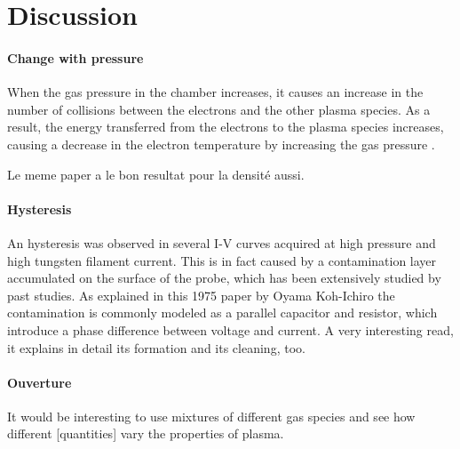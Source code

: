 \section{Discussion}

\paragraph{Change with pressure}
When the gas pressure in the chamber increases, it causes an increase in the number of collisions between the electrons and the other plasma species. 
As a result, the energy transferred from the electrons to the plasma species increases, causing a decrease in the electron temperature by increasing the gas pressure \cite{hassouba_analysis_2013}.

Le meme paper a le bon resultat pour la densité aussi.

\paragraph{Hysteresis}
An hysteresis was observed in several I-V curves acquired at high pressure and high tungsten filament current.
This is in fact caused by a contamination layer accumulated on the surface of the probe, which has been extensively studied by past studies.
As explained in this 1975 paper by Oyama Koh-Ichiro the contamination is commonly modeled as a parallel capacitor and resistor, which introduce a phase difference between voltage and current.
A very interesting read, it explains in detail its formation and its cleaning, too.


\paragraph{Ouverture}
It would be interesting to use mixtures of different gas species and see how different [quantities] vary the properties of plasma.